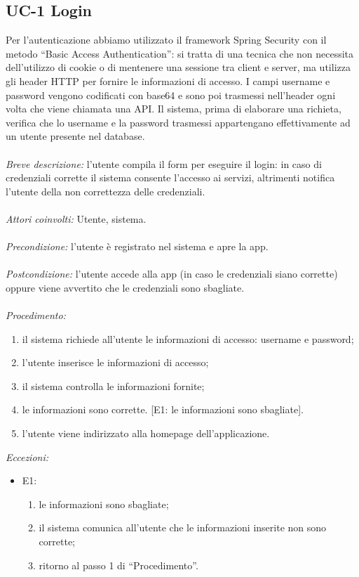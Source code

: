 \subsection{UC-1 Login}
Per l'autenticazione abbiamo utilizzato il framework Spring Security con il metodo ``Basic Access Authentication'': si tratta di una tecnica che non necessita dell'utilizzo di cookie o di mentenere una sessione tra client e server, ma utilizza gli header HTTP per fornire le informazioni di accesso. I campi username e password vengono codificati con base64 e sono poi trasmessi nell'header ogni volta che viene chiamata una API. Il sistema, prima di elaborare una richieta, verifica che lo username e la password trasmessi appartengano effettivamente ad un utente presente nel database. 
\\
\\
\textit{Breve descrizione:} l'utente compila il form per eseguire il login: in caso di credenziali corrette il sistema consente l'accesso ai servizi, altrimenti notifica l'utente della non correttezza delle credenziali.
\\
\\
\textit{Attori coinvolti:} Utente, sistema.
\\
\\
\textit{Precondizione:} l'utente è registrato nel sistema e apre la app.
\\
\\
\textit{Postcondizione:} l'utente accede alla app (in caso le credenziali siano corrette) oppure viene avvertito che le credenziali sono sbagliate.
\\
\\
\textit{Procedimento:}
\begin{enumerate}
	\item il sistema richiede all'utente le informazioni di accesso: username e password;
	\item l'utente inserisce le informazioni di accesso;
	\item il sistema controlla le informazioni fornite;
	\item le informazioni sono corrette. [E1: le informazioni sono sbagliate].
	\item l'utente viene indirizzato alla homepage dell'applicazione.
\end{enumerate}
\newpage
\textit{Eccezioni:}
\begin{itemize}
	\item E1:
	\begin{enumerate}
		\item le informazioni sono sbagliate;
		\item il sistema comunica all'utente che le informazioni inserite non sono corrette;
		\item ritorno al passo 1 di ``Procedimento''.
	\end{enumerate}
\end{itemize}
